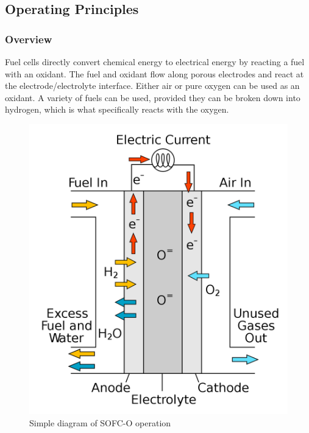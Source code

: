 \documentclass{article}
\begin{document}
\subsection{Operating Principles}

    \subsubsection{Overview}
    Fuel cells directly convert chemical energy to electrical energy by reacting a fuel with an oxidant. The fuel and oxidant flow along porous electrodes and react at the electrode/electrolyte interface. Either air or pure oxygen can be used as an oxidant. A variety of fuels can be used, provided they can be broken down into hydrogen, which is what specifically reacts with the oxygen.
    
    
    \begin{figure}[h]
        \centering
        \includegraphics[scale=0.2]{1200px-Solid_oxide_fuel_cell.png}
        \caption{Simple diagram of SOFC-O operation \cite{LM1}}
        \label{LMfig:SOFCbasic}
    \end{figure}
    
\end{document}
